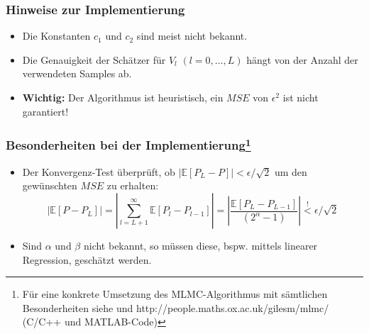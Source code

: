 \begin{frame}[c]
	\frametitle{Hinweise zur Implementierung}
	\begin{itemize}
		\item Die Konstanten $c_1$ und $c_2$ sind meist nicht bekannt.
		\item Die Genauigkeit der Schätzer für $V_l$ $(l=0,\dots,L)$ hängt von der Anzahl der verwendeten Samples ab.
		\newline
		\newline
		\item \textbf{Wichtig:} Der Algorithmus ist heuristisch, ein $MSE$ von $\epsilon^2$ ist \noindent\hspace*{16.25mm}nicht garantiert!
	\end{itemize}
\end{frame}

\begin{frame}[c]
	\frametitle{Besonderheiten bei der Implementierung\footnote{Für eine konkrete Umsetzung des MLMC-Algorithmus mit sämtlichen Besonderheiten siehe \cite{giles2015} und http://people.maths.ox.ac.uk/gilesm/mlmc/ (C/C++ und MATLAB-Code)}}
	\begin{itemize}
		\item Der Konvergenz-Test überprüft, ob $|\mathbb{E}[P_L-P]|<\epsilon/\sqrt{2}$ um den gewünschten $MSE$ zu erhalten:
		\[
			\left|\mathbb{E}[P-P_L]\right|=\left|\sum\limits_{l=L+1}^{\infty}\mathbb{E}[P_l-P_{l-1}]\right|=\left|\frac{\mathbb{E}[P_L-P_{L-1}]}{(2^\alpha-1)}\right|\stackrel{!}{<}\epsilon/\sqrt{2}
		\]
		\item Sind $\alpha$ und $\beta$ nicht bekannt, so müssen diese, bspw. mittels linearer Regression, geschätzt werden.
	\end{itemize}
\end{frame}